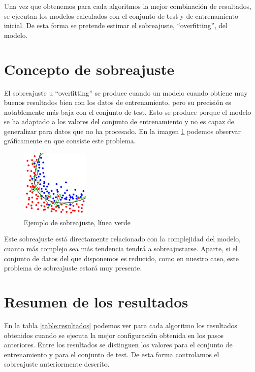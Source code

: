 Una vez que obtenemos para cada algoritmos la mejor combinación de resultados, se ejecutan los modelos calculados con el conjunto de test y de entrenamiento inicial. De esta forma se pretende estimar el sobreajuste, ``overfitting'', del modelo. 

\section{Concepto de sobreajuste}
El sobreajuste u ``overfitting'' se produce cuando un modelo cuando obtiene muy buenos resultados bien con los datos de entrenamiento, pero su precisión es notablemente más baja con el conjunto de test. Esto se produce porque el modelo se ha adaptado a los valores del conjunto de entrenamiento y no es capaz de generalizar para datos que no ha procesado. En la imagen \ref{figure:sobreajuste} podemos observar gráficamente en que consiste este problema.

\begin{figure}[H]
\centering
\includegraphics[width=0.3\textwidth]{figs/Overfitting.png}
\caption{Ejemplo de sobreajuste, línea verde \cite{SobreajusteLibre}}
\label{figure:sobreajuste}
\end{figure}

Este sobreajuste está directamente relacionado con la complejidad del modelo, cuanto más complejo sea más tendencia tendrá a sobreajustarse. Aparte, si el conjunto de datos del que disponemos es reducido, como en nuestro caso, este problema de sobreajuste estará muy presente.

\section{Resumen de los resultados}

En la tabla \ref{table:resultados} podemos ver para cada algoritmo los resultados obtenidos cuando se ejecuta la mejor configuración obtenida en los pasos anteriores. Entre los resultados se distinguen los valores para el conjunto de entrenamiento y para el conjunto de test. De esta forma controlamos el sobreajuste anteriormente descrito.


